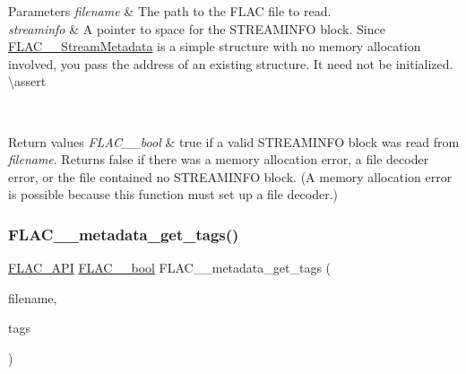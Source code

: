 \begin{DoxyParams}{Parameters}
{\em filename} & The path to the F\+L\+AC file to read. \\
\hline
{\em streaminfo} & A pointer to space for the S\+T\+R\+E\+A\+M\+I\+N\+FO block. Since \mbox{\hyperlink{struct_f_l_a_c_____stream_metadata}{F\+L\+A\+C\+\_\+\+\_\+\+Stream\+Metadata}} is a simple structure with no memory allocation involved, you pass the address of an existing structure. It need not be initialized. \textbackslash{}assert 
\begin{DoxyCode}{1}
\end{DoxyCode}
 
\begin{DoxyCode}{1}
\end{DoxyCode}
 \\
\hline
\end{DoxyParams}

\begin{DoxyRetVals}{Return values}
{\em F\+L\+A\+C\+\_\+\+\_\+bool} & {\ttfamily true} if a valid S\+T\+R\+E\+A\+M\+I\+N\+FO block was read from {\itshape filename}. Returns {\ttfamily false} if there was a memory allocation error, a file decoder error, or the file contained no S\+T\+R\+E\+A\+M\+I\+N\+FO block. (A memory allocation error is possible because this function must set up a file decoder.) \\
\hline
\end{DoxyRetVals}
\mbox{\label{group__flac__metadata__level0_gaf66469f31dca28837ffd3f8b0ec5c082}} 
\subsubsection{\texorpdfstring{FLAC\_\_metadata\_get\_tags()}{FLAC\_\_metadata\_get\_tags()}}
{\footnotesize\ttfamily \mbox{\hyperlink{group__flac__export_ga56ca07df8a23310707732b1c0007d6f5}{F\+L\+A\+C\+\_\+\+A\+PI}} \mbox{\hyperlink{ordinals_8h_a95103469f1cbd78b8cf250194985b34e}{F\+L\+A\+C\+\_\+\+\_\+bool}} F\+L\+A\+C\+\_\+\+\_\+metadata\+\_\+get\+\_\+tags (\begin{DoxyParamCaption}\item[{const char $\ast$}]{filename,  }\item[{\mbox{\hyperlink{struct_f_l_a_c_____stream_metadata}{F\+L\+A\+C\+\_\+\+\_\+\+Stream\+Metadata}} $\ast$$\ast$}]{tags }\end{DoxyParamCaption})}

